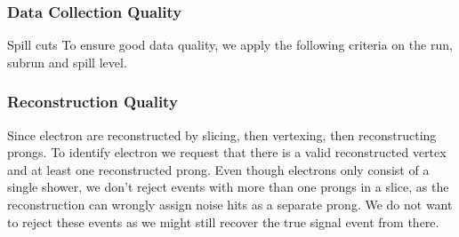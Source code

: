 \subsubsection*{Data Collection Quality}
Spill cuts
To ensure good data quality, we apply the following criteria on the run, subrun and spill level. 


\subsubsection*{Reconstruction Quality}

Since electron are reconstructed by slicing, then vertexing, then reconstructing prongs. To identify electron we request that there is a valid reconstructed vertex and at least one reconstructed prong. Even though electrons only consist of a single shower, we don't reject events with more than one prongs in a slice, as the reconstruction can wrongly assign noise hits as a separate prong. We do not want to reject these events as we might still recover the true signal event from there.


